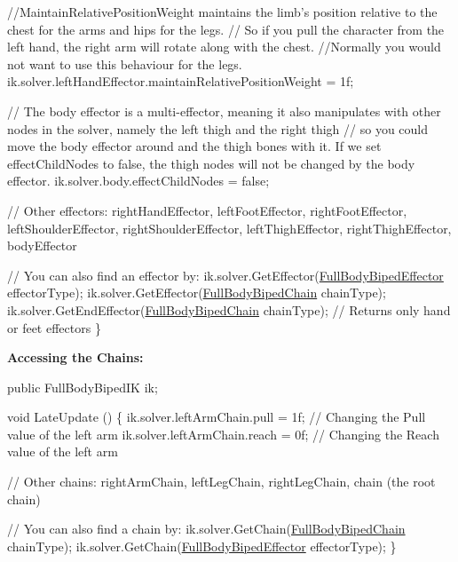 \begin{DoxyCode}
    \textcolor{comment}{//MaintainRelativePositionWeight maintains the limb's position relative to the chest for the arms and
       hips for the legs. }
    \textcolor{comment}{// So if you pull the character from the left hand, the right arm will rotate along with the chest.}
    \textcolor{comment}{//Normally you would not want to use this behaviour for the legs.}
    ik.solver.leftHandEffector.maintainRelativePositionWeight = 1f;

    \textcolor{comment}{// The body effector is a multi-effector, meaning it also manipulates with other nodes in the solver,
       namely the left thigh and the right thigh}
    \textcolor{comment}{// so you could move the body effector around and the thigh bones with it. If we set effectChildNodes
       to false, the thigh nodes will not be changed by the body effector.}
    ik.solver.body.effectChildNodes = \textcolor{keyword}{false};

    \textcolor{comment}{// Other effectors: rightHandEffector, leftFootEffector, rightFootEffector, leftShoulderEffector,
       rightShoulderEffector, leftThighEffector, rightThighEffector, bodyEffector}

    \textcolor{comment}{// You can also find an effector by:}
    ik.solver.GetEffector(\mbox{\hyperlink{namespace_root_motion_1_1_final_i_k_ae0dd2058c7667b6f132c11a6b860c14a}{FullBodyBipedEffector}} effectorType);
    ik.solver.GetEffector(\mbox{\hyperlink{namespace_root_motion_1_1_final_i_k_ae8848c0353270a08dcfe8b85a5c9b761}{FullBodyBipedChain}} chainType);
    ik.solver.GetEndEffector(\mbox{\hyperlink{namespace_root_motion_1_1_final_i_k_ae8848c0353270a08dcfe8b85a5c9b761}{FullBodyBipedChain}} chainType); \textcolor{comment}{// Returns only hand or feet
       effectors}
\}
\end{DoxyCode}


{\bfseries Accessing the Chains\+:}


\begin{DoxyCode}
\textcolor{keyword}{public} FullBodyBipedIK ik;

\textcolor{keywordtype}{void} LateUpdate () \{
    ik.solver.leftArmChain.pull = 1f; \textcolor{comment}{// Changing the Pull value of the left arm}
    ik.solver.leftArmChain.reach = 0f; \textcolor{comment}{// Changing the Reach value of the left arm}

    \textcolor{comment}{// Other chains: rightArmChain, leftLegChain, rightLegChain, chain (the root chain)}

    \textcolor{comment}{// You can also find a chain by:}
    ik.solver.GetChain(\mbox{\hyperlink{namespace_root_motion_1_1_final_i_k_ae8848c0353270a08dcfe8b85a5c9b761}{FullBodyBipedChain}} chainType);
    ik.solver.GetChain(\mbox{\hyperlink{namespace_root_motion_1_1_final_i_k_ae0dd2058c7667b6f132c11a6b860c14a}{FullBodyBipedEffector}} effectorType);
\}
\end{DoxyCode}


